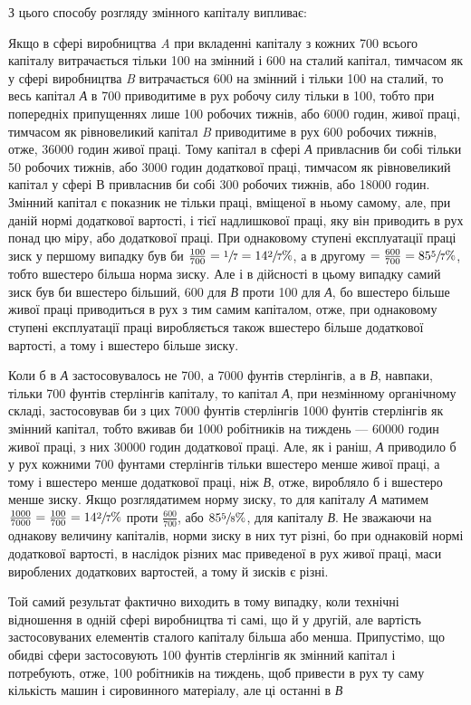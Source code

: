 
З цього способу розгляду змінного капіталу випливає:

Якщо в сфері виробництва \emph{A} при вкладенні капіталу з кожних 700 всього
капіталу витрачається тільки 100 на змінний
і 600 на сталий капітал, тимчасом як у сфері виробництва \emph{B}
витрачається 600 на змінний і тільки 100 на сталий, то весь
капітал \emph{А} в 700 приводитиме в рух робочу силу тільки в 100,
тобто при попередніх припущеннях лише 100 робочих тижнів,
або 6000 годин, живої праці, тимчасом як рівновеликий капітал \emph{B}
приводитиме в рух 600 робочих тижнів, отже, 36000 годин живої праці.
Тому капітал в сфері \emph{А} привласнив би собі тільки
50 робочих тижнів, або 3000 годин додаткової праці, тимчасом
як рівновеликий капітал у сфері В привласнив би собі 300 робочих тижнів,
або 18000 годин. Змінний капітал є показник не
тільки праці, вміщеної в ньому самому, але, при даній нормі
додаткової вартості, і тієї надлишкової праці, яку він приводить
в рух понад цю міру, або додаткової праці. При однаковому
ступені експлуатації праці зиск у першому випадку був би $\frac{100}{700} = \sfrac{1}{7} = 14\sfrac{2}{7}\%$, а
в другому $= \frac{600}{700} = 85\sfrac{5}{7}\%$, тобто вшестеро
більша норма зиску. Але і в дійсності в цьому випадку самий
зиск був би вшестеро більший, 600 для \emph{В} проти 100 для \emph{А}, бо
вшестеро більше живої праці приводиться в рух з тим самим
капіталом, отже, при однаковому ступені експлуатації праці
виробляється також вшестеро більше додаткової вартості, а тому
і вшестеро більше зиску.

Коли б в \emph{А} застосовувалось не 700, а 7000 фунтів стерлінгів, а
в \emph{В}, навпаки, тільки 700 фунтів стерлінгів капіталу, то
капітал \emph{А}, при незмінному органічному складі, застосовував би
з цих 7000 фунтів стерлінгів 1000 фунтів стерлінгів як змінний
капітал, тобто вживав би 1000 робітників на тиждень — 60000 годин живої праці,
з них 30000 годин додаткової праці. Але,
як і раніш, \emph{А} приводило б у рух кожними 700 фунтами стерлінгів тільки
вшестеро менше живої праці, а тому і вшестеро
менше додаткової праці, ніж \emph{В}, отже, виробляло б і вшестеро
менше зиску. Якщо розглядатимем норму зиску, то для капіталу \emph{А} матимем
$\frac{1000}{7000} = \frac{100}{700} = 14\sfrac{2}{7}\%$
проти $\frac{600}{700}$, або $85\sfrac{5}{8}\%$, для
капіталу \emph{В}. Не зважаючи на однакову величину капіталів, норми
зиску в них тут різні, бо при однаковій нормі додаткової
вартості, в наслідок різних мас приведеної в рух живої праці,
маси вироблених додаткових вартостей, а тому й зисків є різні.

Той самий результат фактично виходить в тому випадку, коли
технічні відношення в одній сфері виробництва ті самі, що й
у другій, але вартість застосовуваних елементів сталого капіталу більша або менша. Припустімо, що
обидві сфери застосовують 100 фунтів стерлінгів як змінний капітал і потребують, отже, 100
робітників на тиждень, щоб привести в рух ту саму
кількість машин і сировинного матеріалу, але ці останні в \emph{В}
\parbreak{}  %
